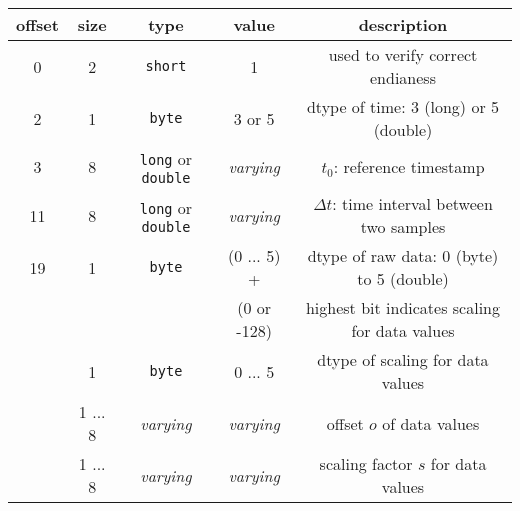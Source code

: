 \documentclass[a4paper,10pt]{article}
\begin{document}
\begin{table}[htbp]
 \centering
 \begin{tabular}{|c|c|c|c|c|}
    \hline
    offset         & size             & type                             & value                  & description \\
    \hline                                                                                        
    0              & 2                & \texttt{short}                   & 1                      & used to verify correct endianess  \\
    \hline                                                                                        
    2              & 1                & \texttt{byte}                    & 3 or 5                 & dtype of time: 3 (long) or 5 (double) \\
    \hline                                                                                        
    3              & 8                & \texttt{long} or \texttt{double} & \textit{varying}       & $t_0$: reference timestamp \\
    \hline                                                                                        
    11             & 8                & \texttt{long} or \texttt{double} & \textit{varying}       & $\Delta t$: time interval between two samples \\
    \hline                            
    19             & 1                & \texttt{byte}                    & (0 ... 5) +            & dtype of raw data: 0 (byte) to 5 (double) \\
     ~             & ~                &      ~                           & (0 or -128)            & highest bit indicates scaling for data values \\
    \hline                                                               
    [20]           & 1                & \texttt{byte}                    & 0 ... 5                & dtype of scaling for data values \\
    \hline                            
    [21]           & 1 ... 8          & \textit{varying}                 & \textit{varying}       & offset $o$ of data values \\
    \hline                                                                                        
    [22 ... 29]    & 1 ... 8          & \textit{varying}                 & \textit{varying}       & scaling factor $s$ for data values \\
    \hline                                                                                        

\end{tabular}
\end{table}
\end{document}
